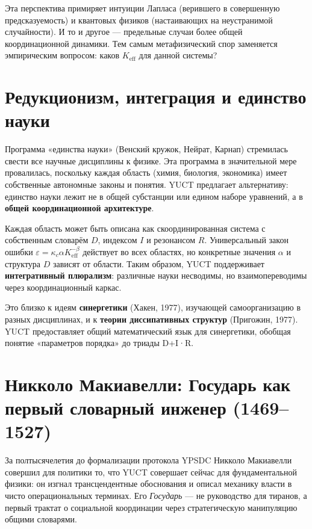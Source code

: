 \documentclass[12pt,a4paper]{article}
\begin{document}
	Эта перспектива примиряет интуиции Лапласа (верившего в совершенную предсказуемость) и квантовых физиков (настаивающих на неустранимой случайности). И то и другое — предельные случаи более общей координационной динамики. Тем самым метафизический спор заменяется эмпирическим вопросом: каков \(K_{\mathrm{eff}}\) для данной системы?
	
	\section{Редукционизм, интеграция и единство науки}
	
	Программа «единства науки» (Венский кружок, Нейрат, Карнап) стремилась свести все научные дисциплины к физике. Эта программа в значительной мере провалилась, поскольку каждая область (химия, биология, экономика) имеет собственные автономные законы и понятия. YUCT предлагает альтернативу: единство науки лежит не в общей субстанции или едином наборе уравнений, а в \textbf{общей координационной архитектуре}.
	
	Каждая область может быть описана как скоординированная система с собственным словарём \(D\), индексом \(I\) и резонансом \(R\). Универсальный закон ошибки \(\varepsilon = \kappa_c \alpha K_{\mathrm{eff}}^{-\beta}\) действует во всех областях, но конкретные значения \(\alpha\) и структура \(D\) зависят от области. Таким образом, YUCT поддерживает \textbf{интегративный плюрализм}: различные науки несводимы, но взаимопереводимы через координационный каркас.
	
	Это близко к идеям \textbf{синергетики} (Хакен, 1977), изучающей самоорганизацию в разных дисциплинах, и к \textbf{теории диссипативных структур} (Пригожин, 1977). YUCT предоставляет общий математический язык для синергетики, обобщая понятие «параметров порядка» до триады D+I·R.
	
	\section{Никколо Макиавелли: Государь как первый словарный инженер (1469–1527)}
	\label{sec:machiavelli}
	
	За полтысячелетия до формализации протокола YPSDC Никколо Макиавелли совершил для политики то, что YUCT совершает сейчас для фундаментальной физики: он изгнал трансцендентные обоснования и описал механику власти в чисто операциональных терминах. Его \emph{Государь} — не руководство для тиранов, а первый трактат о социальной координации через стратегическую манипуляцию общими словарями.
	
\end{document}

